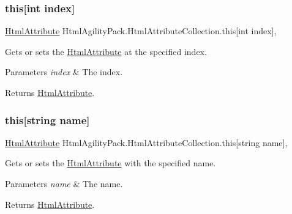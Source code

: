 \subsubsection{\texorpdfstring{this[int index]}{this[int index]}}
{\footnotesize\ttfamily \hyperlink{class_html_agility_pack_1_1_html_attribute}{Html\+Attribute} Html\+Agility\+Pack.\+Html\+Attribute\+Collection.\+this\mbox{[}int index\mbox{]}\hspace{0.3cm}{\ttfamily [get]}, {\ttfamily [set]}}



Gets or sets the \hyperlink{class_html_agility_pack_1_1_html_attribute}{Html\+Attribute} at the specified index. 


\begin{DoxyParams}{Parameters}
{\em index} & The index.\\
\hline
\end{DoxyParams}
\begin{DoxyReturn}{Returns}
\hyperlink{class_html_agility_pack_1_1_html_attribute}{Html\+Attribute}.
\end{DoxyReturn}
\mbox{\label{class_html_agility_pack_1_1_html_attribute_collection_a928e95249a940b48a9bb7f1bf13b1294}} 
\subsubsection{\texorpdfstring{this[string name]}{this[string name]}}
{\footnotesize\ttfamily \hyperlink{class_html_agility_pack_1_1_html_attribute}{Html\+Attribute} Html\+Agility\+Pack.\+Html\+Attribute\+Collection.\+this\mbox{[}string name\mbox{]}\hspace{0.3cm}{\ttfamily [get]}, {\ttfamily [set]}}



Gets or sets the \hyperlink{class_html_agility_pack_1_1_html_attribute}{Html\+Attribute} with the specified name. 


\begin{DoxyParams}{Parameters}
{\em name} & The name.\\
\hline
\end{DoxyParams}
\begin{DoxyReturn}{Returns}
\hyperlink{class_html_agility_pack_1_1_html_attribute}{Html\+Attribute}.
\end{DoxyReturn}

